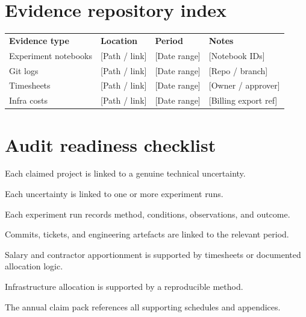 \documentclass[11pt]{article}
\begin{document}
\section{Evidence repository index}
\begin{xltabular}{\textwidth}{L{3.0cm}L{3.8cm}L{2.4cm}Y}
\textbf{Evidence type} & \textbf{Location} & \textbf{Period} & \textbf{Notes} \\
Experiment notebooks & {[Path / link]} & {[Date range]} & {[Notebook IDs]} \\
Git logs & {[Path / link]} & {[Date range]} & {[Repo / branch]} \\
Timesheets & {[Path / link]} & {[Date range]} & {[Owner / approver]} \\
Infra costs & {[Path / link]} & {[Date range]} & {[Billing export ref]} \\
\end{xltabular}

\section{Audit readiness checklist}
\begin{RDChecklist}
\item Each claimed project is linked to a genuine technical uncertainty.
\item Each uncertainty is linked to one or more experiment runs.
\item Each experiment run records method, conditions, observations, and outcome.
\item Commits, tickets, and engineering artefacts are linked to the relevant period.
\item Salary and contractor apportionment is supported by timesheets or documented allocation logic.
\item Infrastructure allocation is supported by a reproducible method.
\item The annual claim pack references all supporting schedules and appendices.
\end{RDChecklist}

\RDEndMatter
\end{document}

